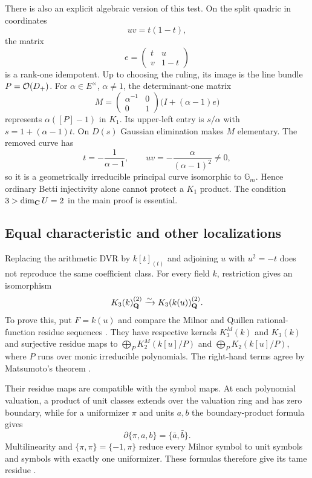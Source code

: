 There is also an explicit algebraic version of this test. On the split quadric in coordinates
\[
uv=t(1-t),
\]
the matrix
\[
e=\begin{pmatrix}t&u\\v&1-t\end{pmatrix}
\]
is a rank-one idempotent. Up to choosing the ruling, its image is the line bundle $P=\mathcal O(D_+)$. For $\alpha\in E^\times$, $\alpha\neq1$, the determinant-one matrix
\[
M=\begin{pmatrix}\alpha^{-1}&0\\0&1\end{pmatrix}
\bigl(I+(\alpha-1)e\bigr)
\]
represents $\alpha([P]-1)$ in $K_1$. Its upper-left entry is $s/\alpha$ with $s=1+(\alpha-1)t$. On $D(s)$ Gaussian elimination makes $M$ elementary. The removed curve has
\[
t=-\frac1{\alpha-1},\qquad uv=-\frac{\alpha}{(\alpha-1)^2}\neq0,
\]
so it is a geometrically irreducible principal curve isomorphic to $\mathbb G_m$. Hence ordinary Betti injectivity alone cannot protect a $K_1$ product. The condition $3>\dim_{\mathbf C}U=2$ in the main proof is essential.

\subsection{Equal characteristic and other localizations}
Replacing the arithmetic DVR by $k[t]_{(t)}$ and adjoining $u$
with $u^2=-t$ does not reproduce the same coefficient class.
For every field $k$, restriction gives an isomorphism
\[
 K_3(k)_{\mathbf Q}^{(2)}
       \xrightarrow{\sim}K_3(k(u))_{\mathbf Q}^{(2)}.
\]
To prove this, put $F=k(u)$ and compare the Milnor and Quillen
rational-function residue sequences
\cite[III, Theorem~7.4; V, Corollary~6.7.1]{Weibel}.
They have respective kernels $K_3^M(k)$ and $K_3(k)$ and
surjective residue maps to
$\bigoplus_P K_2^M(k[u]/P)$ and
$\bigoplus_P K_2(k[u]/P)$, where $P$ runs over monic
irreducible polynomials.
The right-hand terms agree by Matsumoto's theorem
\cite[III, Theorem~6.1]{Weibel}.

Their residue maps are compatible with the symbol maps.
At each polynomial valuation, a product of unit classes extends
over the valuation ring and has zero boundary, while for a
uniformizer $\pi$ and units $a,b$ the boundary-product formula gives
\[
 \partial\{\pi,a,b\}=\{\bar a,\bar b\}.
\]
Multilinearity and $\{\pi,\pi\}=\{-1,\pi\}$ reduce every Milnor
symbol to unit symbols and symbols with exactly one uniformizer.
These formulas therefore give its tame residue
\cite[III, Theorem~7.3; V, equation~(6.1.1),
Example~6.1.2, and Lemma~6.7.3]{Weibel}.

